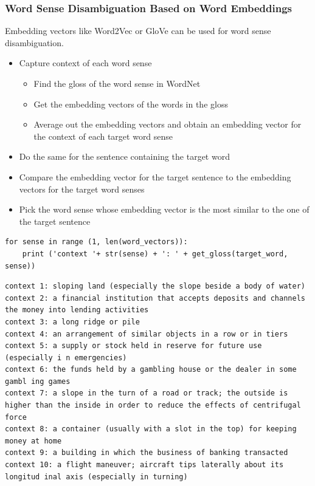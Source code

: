 \documentclass[11pt]{article}
\begin{document}
\subsubsection{Word Sense Disambiguation Based on Word Embeddings}
Embedding vectors like Word2Vec or GloVe can be used for word sense disambiguation.
\begin{itemize}
	\item Capture context of each word sense
	\begin{itemize}
		\item Find the gloss of the word sense in WordNet
		\item Get the embedding vectors of the words in the gloss
		\item Average out the embedding vectors and obtain an embedding vector for the context of each target word sense
	\end{itemize}
	\item Do the same for the sentence containing the target word
	\item Compare the embedding vector  for the target sentence to the embedding vectors for the target word senses
	\item Pick the word sense whose embedding vector is the most similar to the one of the target sentence
\end{itemize}

\begin{verbatim}
for sense in range (1, len(word_vectors)):
	print ('context '+ str(sense) + ': ' + get_gloss(target_word, sense)) 
\end{verbatim}
\begin{verbatim}
context 1: sloping land (especially the slope beside a body of water) 
context 2: a financial institution that accepts deposits and channels the money into lending activities 
context 3: a long ridge or pile 
context 4: an arrangement of similar objects in a row or in tiers 
context 5: a supply or stock held in reserve for future use (especially i n emergencies) 
context 6: the funds held by a gambling house or the dealer in some gambl ing games 
context 7: a slope in the turn of a road or track; the outside is higher than the inside in order to reduce the effects of centrifugal force 
context 8: a container (usually with a slot in the top) for keeping money at home 
context 9: a building in which the business of banking transacted 
context 10: a flight maneuver; aircraft tips laterally about its longitud inal axis (especially in turning) 
\end{verbatim}
\end{document}
